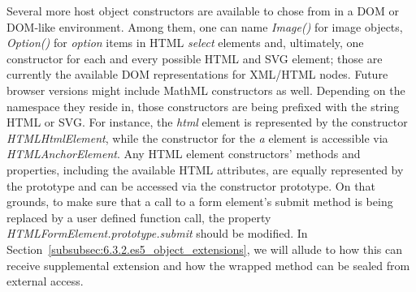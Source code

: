     Several more host object constructors are available to chose from in a DOM or DOM-like environment. Among them, one can name \textit{Image()} for image objects, \textit{Option()} for \textit{option} items in HTML \textit{select} elements and, ultimately, one constructor for each and every possible HTML and SVG element; those are currently the available DOM representations for XML/HTML nodes. Future browser versions might include MathML constructors as well. Depending on the namespace they reside in, those constructors are being prefixed with the string HTML or SVG. For instance, the \textit{html} element is represented by the constructor \textit{HTMLHtmlElement}, while the constructor for the \textit{a} element is accessible via \textit{HTMLAnchorElement}. Any HTML element constructors' methods and properties, including the available HTML attributes, are equally represented by the prototype and can be accessed via the constructor prototype. On that grounds, to make sure that a call to a form element's submit method is being replaced by a user defined function call, the property \textit {HTMLFormElement.prototype.submit} should be modified. In Section~\ref{subsubsec:6.3.2.es5_object_extensions}, we will allude to how this can receive supplemental extension and how the wrapped method can be sealed from external access.\\

